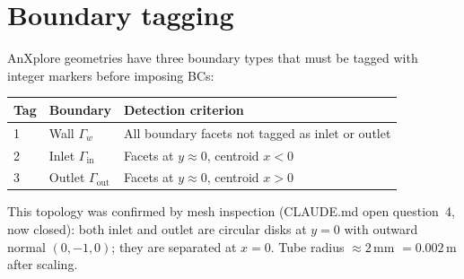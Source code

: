 \documentclass[11pt]{article}
\begin{document}
\section{Boundary tagging}
\label{sec:boundary_tagging}

AnXplore geometries have three boundary types that must be tagged
with integer markers before imposing BCs:

\begin{center}
\begin{tabular}{lll}
\toprule
\textbf{Tag} & \textbf{Boundary} & \textbf{Detection criterion} \\
\midrule
1 & Wall $\Gamma_w$ & All boundary facets not tagged as inlet or outlet \\
2 & Inlet $\Gamma_\text{in}$ & Facets at $y \approx 0$, centroid $x < 0$ \\
3 & Outlet $\Gamma_\text{out}$ & Facets at $y \approx 0$, centroid $x > 0$ \\
\bottomrule
\end{tabular}
\end{center}

This topology was confirmed by mesh inspection (CLAUDE.md open question~4,
now closed): both inlet and outlet are circular disks at $y=0$ with outward
normal $(0,-1,0)$; they are separated at $x=0$. Tube radius $\approx 2\,\text{mm}$
$= 0.002\,\text{m}$ after scaling.
\end{document}
